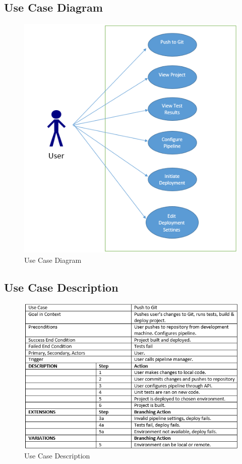   \subsection{Use Case Diagram}
    \begin{figure}[H]
        \includegraphics[width = 1.2\linewidth]{diagrams/UseCaseDiagram}
        \caption{Use Case Diagram}
        \label{fig:use_case_diagram}
      \end{figure}

   \subsection{Use Case Description}
   \begin{figure}[H]
       \includegraphics[width = 1.2\linewidth]{diagrams/DetailedUseCase}
       \caption{Use Case Description}
       \label{fig:use_case_description}
     \end{figure}



